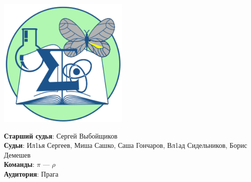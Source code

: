 \documentclass[12pt]{article}
\begin{document}
\begin{minipage}{.30\textwidth}
\begin{center}
\includegraphics[width=0.48\textwidth]{klshlogo.pdf}
\end{center}
\end{minipage}
\begin{minipage}{.65\textwidth}
\begin{flushleft}
{\bf Старший судья}: Сергей Выбойщиков\\ 
{\bf Судьи}: Ил1ья Сергеев, Миша Сашко, Саша Гончаров, Вл1ад Сидельников, Борис Демешев\\ 
{\bf Команды}: $\pi$ --- $\rho$\\ 
{\bf Аудитория}: Прага\\ 
\end{flushleft}
\end{minipage}
\end{document}

